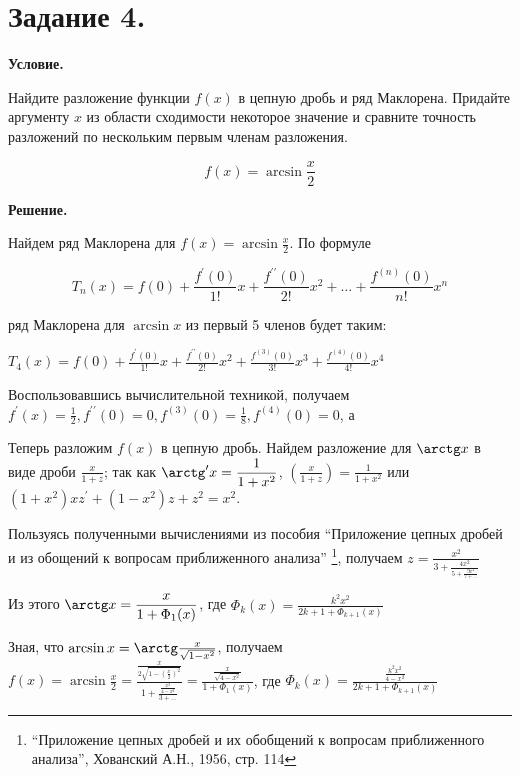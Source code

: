 \section{Задание 4.}

\textbf{Условие.}

Найдите разложение функции $f(x)$ в цепную дробь и ряд Маклорена. Придайте аргументу $x$ из области 
сходимости некоторое значение и сравните точность разложений по нескольким первым членам разложения. 

\[f(x) = \arcsin \frac{x}{2}\]

\vspace{10mm}

\textbf{Решение.}

Найдем ряд Маклорена для $f(x) = \arcsin \frac{x}{2}$. По формуле

\[T_n(x) = f(0) + \frac{f^\prime(0)}{1!} x + \frac{f^{\prime\prime}(0)}{2!} x^2 + \dots + \frac{f^{(n)}(0)}{n!} x^n\]

ряд Маклорена для $\arcsin x$ из первый 5 членов будет таким:

$\displaystyle T_4(x) = f(0) + \frac{f^\prime(0)}{1!} x + \frac{f^{\prime\prime}(0)}{2!} x^2 + \frac{f^{(3)}(0)}{3!} x^3 + \frac{f^{(4)}(0)}{4!} x^4$

Воспользовавшись вычислительной техникой, получаем $f^\prime(x) = \frac{1}{2}, f^{\prime\prime}(0) = 0, f^{(3)}(0) = \frac{1}{8}, f^{(4)}(0) = 0$,
а 

\vspace{6mm}

Теперь разложим $f(x)$ в цепную дробь. Найдем разложение для $\arctg x$ в виде дроби $\displaystyle \frac{x}{1 + z}$;
так как $\displaystyle \arctg^\prime x = \frac{1}{1 + x^2}$, $\left(\frac{x}{1 + z}\right) = \frac{1}{1 + x^2}$ или 
$\displaystyle (1 + x^2)xz^\prime + (1 - x^2)z + z^2 = x^2$. 

Пользуясь полученными вычислениями из пособия \enquote{Приложение цепных дробей и из обощений к вопросам приближенного анализа}
\footnote{\enquote{Приложение цепных дробей и их обобщений к вопросам приближенного анализа}, Хованский А.Н., 1956, стр. 114},
получаем $\displaystyle z = \frac{x^2}{3 + \frac{4x^2}{5 + \frac{9x^2}{7 + \dots}}}$

Из этого $\displaystyle \arctg x = \frac{x}{1 + \Phi_1(x)}$, где $\Phi_k(x) = \frac{k^2x^2}{2k + 1 + \Phi_{k + 1}(x)}$

Зная, что $\arcsin x = \arctg \frac{x}{\sqrt{1 - x^2}}$, получаем 
$\displaystyle f(x) = \arcsin \frac{x}{2} = \frac{\frac{x}{2\sqrt{1 - (\frac{x}{2})^2}}}{1 + \frac{\frac{x^2}{4 - x^2}}{3 + \dots}} = 
\frac{\frac{x}{\sqrt{4 - x^2}}}{1 + \Phi_1(x)}$, где $\displaystyle \Phi_k(x) = \frac{\frac{k^2x^2}{4 - x^2}}{2k + 1 + \Phi_{k + 1}(x)}$

